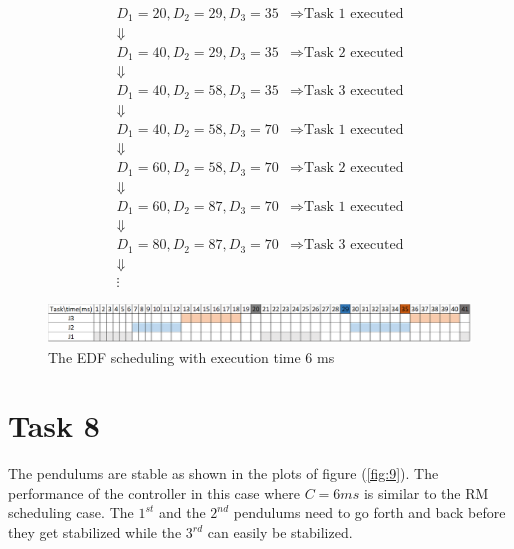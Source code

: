 \documentclass[a4paper,12pt,oneside,onecolumn]{article} %
\begin{document}
\begin{equation*}
\begin{aligned}
D_1 = 20, D_2 = 29, D_3 = 35  & \Rightarrow \textrm{Task 1 executed} \\ \Downarrow & \\ 
D_1 = 40, D_2 = 29, D_3 = 35  & \Rightarrow \textrm{Task 2 executed} \\ \Downarrow & \\ 
D_1 = 40, D_2 = 58, D_3 = 35  & \Rightarrow \textrm{Task 3 executed} \\ \Downarrow & \\ 
D_1 = 40, D_2 = 58, D_3 = 70  & \Rightarrow \textrm{Task 1 executed} \\ \Downarrow & \\ 
D_1 = 60, D_2 = 58, D_3 = 70  & \Rightarrow \textrm{Task 2 executed} \\ \Downarrow & \\ 
D_1 = 60, D_2 = 87, D_3 = 70  & \Rightarrow \textrm{Task 1 executed} \\ \Downarrow & \\ 
D_1 = 80, D_2 = 87, D_3 = 70  & \Rightarrow \textrm{Task 3 executed} \\ \Downarrow & \\ 
\vdots
\end{aligned}
\end{equation*}

\begin{figure}[H]
    \centering
    \includegraphics[scale=0.65]{Task_7.png}
    \caption{The EDF scheduling with execution time 6 ms}
    \label{fig:8}
\end{figure}

\section*{Task 8}
The pendulums are stable as shown in the plots of figure (\ref{fig:9}). The performance of the controller in this case where $C=6ms$ is similar to the RM scheduling case. The $1^{st}$ and the $2^{nd}$ pendulums need to go forth and back before they get stabilized while the $3^{rd}$ can easily be stabilized.
\end{document}
